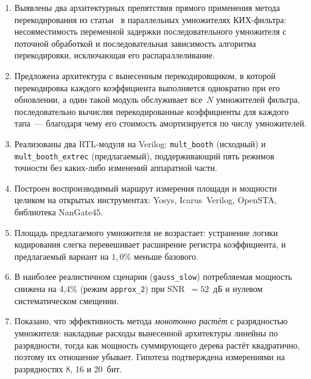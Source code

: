 \documentclass[a4paper, 12pt, oneside]{report}
\begin{document}
\begin{enumerate}
  \item Выявлены два архитектурных препятствия прямого применения
        метода перекодирования из статьи~\cite{zhu2025} в параллельных умножителях
        КИХ-фильтра: несовместимость переменной задержки последовательного
        умножителя с поточной обработкой и последовательная зависимость
        алгоритма перекодировки, исключающая его распараллеливание.

  \item Предложена архитектура с вынесенным перекодировщиком, в которой
        перекодировка каждого коэффициента выполняется однократно при его
        обновлении, а один такой модуль обслуживает все~$N$ умножителей
        фильтра, последовательно вычисляя перекодированные коэффициенты
        для каждого тапа~--- благодаря чему его стоимость амортизируется
        по числу умножителей.

  \item Реализованы два RTL-модуля на Verilog: \texttt{mult\_booth}
        (исходный) и \newline \texttt{mult\_booth\_extrec} (предлагаемый),
        поддерживающий пять режимов точности без каких-либо изменений
        аппаратной части.

  \item Построен воспроизводимый маршрут измерения площади и мощности
        целиком на открытых инструментах: Yosys, Icarus~Verilog,
        OpenSTA, библиотека NanGate45.

  \item Площадь предлагаемого умножителя не возрастает: устранение
        логики кодирования слегка перевешивает расширение регистра
        коэффициента, и предлагаемый вариант на $1{,}0\%$ меньше базового.

  \item В наиболее реалистичном сценарии (\texttt{gauss\_slow})
        потребляемая мощность снижена на 4{,}4\% (режим \texttt{approx\_2})
        при SNR~$= 52$~дБ и нулевом систематическом смещении.

  \item Показано, что эффективность метода \textit{монотонно растёт}
        с разрядностью умножителя: накладные расходы вынесенной
        архитектуры линейны по разрядности, тогда как мощность
        суммирующего дерева растёт квадратично, поэтому их отношение
        убывает. Гипотеза подтверждена измерениями на разрядностях
        8, 16 и 20~бит.
\end{enumerate}
\end{document}
